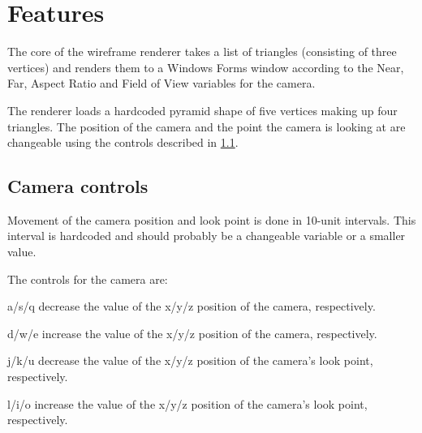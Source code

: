 \section{Features}
The core of the wireframe renderer takes a list of triangles (consisting of three vertices) and renders them to a Windows Forms window according to the Near, Far, Aspect Ratio and Field of View variables for the camera. 

The renderer loads a hardcoded pyramid shape of five vertices making up four triangles. The position of the camera and the point the camera is looking at are changeable using the controls described in \ref{CC}.

\subsection{Camera controls}
\label{CC}
Movement of the camera position and look point is done in 10-unit intervals. This interval is hardcoded and should probably be a changeable variable or a smaller value.

The controls for the camera are:
\begin{my_itemize}
\item a/s/q decrease the value of the x/y/z position of the camera, respectively.
\item d/w/e increase the value of the x/y/z position of the camera, respectively.
\item j/k/u decrease the value of the x/y/z position of the camera's look point, respectively.
\item l/i/o increase the value of the x/y/z position of the camera's look point, respectively.
\end{my_itemize}